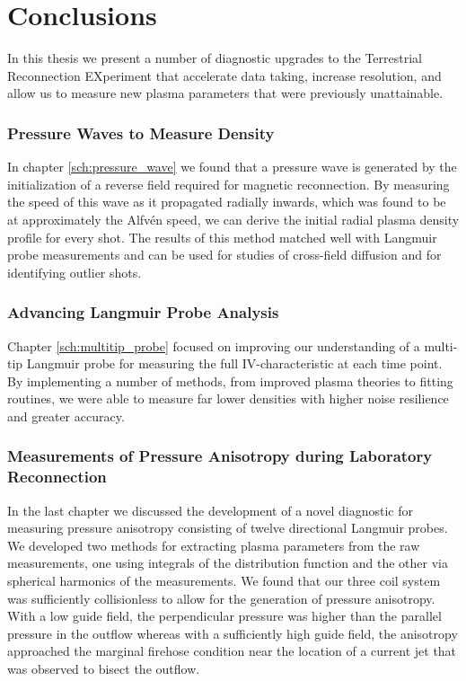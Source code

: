 \chapter{Conclusions}

In this thesis we present a number of diagnostic upgrades to the Terrestrial Reconnection EXperiment that accelerate data taking, increase resolution, and allow us to measure new plasma parameters that were previously unattainable.

\subsection{Pressure Waves to Measure Density}

In chapter \ref{sch:pressure_wave} we found that a pressure wave is generated by the initialization of a reverse field required for magnetic reconnection. By measuring the speed of this wave as it propagated radially inwards, which was found to be at approximately the Alfv\'en speed, we can derive the initial radial plasma density profile for every shot. The results of this method matched well with Langmuir probe measurements and can be used for studies of cross-field diffusion and for identifying outlier shots.

\subsection{Advancing Langmuir Probe Analysis}

Chapter \ref{sch:multitip_probe} focused on improving our understanding of a multi-tip Langmuir probe for measuring the full IV-characteristic at each time point. By implementing a number of methods, from improved plasma theories to fitting routines, we were able to measure far lower densities with higher noise resilience and greater accuracy.

\subsection{Measurements of Pressure Anisotropy during Laboratory Reconnection}

In the last chapter we discussed the development of a novel diagnostic for measuring pressure anisotropy consisting of twelve directional Langmuir probes. We developed two methods for extracting plasma parameters from the raw measurements, one using integrals of the distribution function and the other via spherical harmonics of the measurements. We found that our three coil system was sufficiently collisionless to allow for the generation of pressure anisotropy. With a low guide field, the perpendicular pressure was higher than the parallel pressure in the outflow whereas with a sufficiently high guide field, the anisotropy approached the marginal firehose condition near the location of a current jet that was observed to bisect the outflow.

